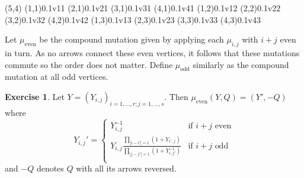 \documentclass{amsart}
\theoremstyle{definition}
\newtheorem{exercise}[theorem]{Exercise}
\theoremstyle{remark}
\numberwithin{equation}{section}
\begin{document}
	\begin{pspicture}(5,4)
		\cnode(1,1){0.1}{v11}
		\cnode(2,1){0.1}{v21}
		\cnode(3,1){0.1}{v31}
		\cnode(4,1){0.1}{v41}
		\cnode(1,2){0.1}{v12}
		\cnode(2,2){0.1}{v22}
		\cnode(3,2){0.1}{v32}
		\cnode(4,2){0.1}{v42}
		\cnode(1,3){0.1}{v13}
		\cnode(2,3){0.1}{v23}
		\cnode(3,3){0.1}{v33}
		\cnode(4,3){0.1}{v43}
	\end{pspicture}
	
	Let $\mu_{\textrm{even}}$ be the compound mutation given by applying each $\mu_{i,j}$ with $i+j$ even in turn.  As no arrows connect these even vertices, it follows that these mutations commute so the order does not matter.  Define $\mu_{\textrm{odd}}$ similarly as the compound mutation at all odd vertices.
	
	\begin{exercise}
		Let $Y = (Y_{i,j})_{i=1,\ldots, r; j=1,\ldots, s}$.  Then $\mu_{\textrm{even}}(Y,Q) = (Y',-Q)$ where
		\begin{equation} \label{eq:YSystemCases}
			Y_{i,j}' = \begin{cases}
			Y_{i,j}^{-1} & \textrm{if $i+j$ even} \\
			Y_{i,j}\frac{\displaystyle\prod_{|i-i'|=1}(1+Y_{i',j})}{\displaystyle\prod_{|j-j'|=1}(1+Y_{i,j'}^{-1})} & \textrm{if $i+j$ odd} \\
			\end{cases}
		\end{equation}
		and $-Q$ denotes $Q$ with all its arrows reversed.
	\end{exercise}
	
\end{document}
